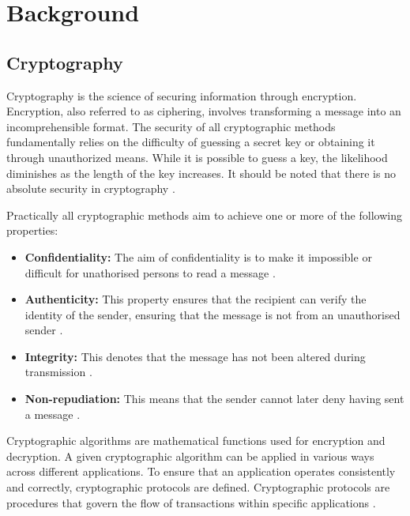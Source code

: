 \chapter{Background} \label{chap:background}
\section{Cryptography}
Cryptography is the science of securing information through encryption. Encryption, also referred to as ciphering, involves transforming a message into an incomprehensible format. The security of all cryptographic methods fundamentally relies on the difficulty of guessing a secret key or obtaining it through unauthorized means. While it is possible to guess a key, the likelihood diminishes as the length of the key increases. It should be noted that there is no absolute security in cryptography \cite[18, 25]{crypto}.

Practically all cryptographic methods aim to achieve one or more of the following properties:
\begin{itemize}
    \item \textbf{Confidentiality:} The aim of confidentiality is to make it impossible or difficult for unathorised persons to read a message \cite[18]{crypto}.
    \item \textbf{Authenticity:} This property ensures that the recipient can verify the identity of the sender, ensuring that the message is not from an unauthorised sender \cite[18]{crypto}.
    \item \textbf{Integrity:} This denotes that the message has not been altered during transmission \cite[18]{crypto}.
    \item \textbf{Non-repudiation:} This means that the sender cannot later deny having sent a message \cite[18]{crypto}.
\end{itemize}

Cryptographic algorithms are mathematical functions used for encryption and decryption. A given cryptographic algorithm can be applied in various ways across different applications. To ensure that an application operates consistently and correctly, cryptographic protocols are defined. Cryptographic protocols are procedures that govern the flow of transactions within specific applications \cite[19,22]{crypto}.


